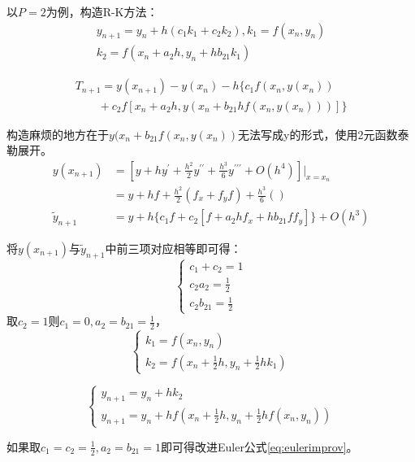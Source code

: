 \documentclass{article}
\begin{document}
以$P=2$为例，构造R-K方法：
$$
\begin{array}{lr}
    y_{n+1} = y_n + h(c_1k_1+c_2k_2), k_1=f(x_n, y_n)\\
    k_2 = f(x_n+a_2h, y_n+hb_{21}k_1)
\end{array}
$$

\begin{equation*}
    \begin{array}{lr}
        T_{n+1}=y(x_{n+1})-y(x_n)-h\{c_1f(x_n, y(x_n)) \\
        \quad \quad +c_2f[x_n+a_2h, y(x_n+b_{21}hf(x_n, y(x_n)))]\}
    \end{array}
\end{equation*}

构造麻烦的地方在于$y(x_n+b_{21}f(x_n, y(x_n))$无法写成y的形式，使用2元函数泰勒展开。
\begin{equation*}
    \begin{split}
        y(x_{n+1})&=[y+hy^{'}+\frac{h^2}{2}y^{{'}{'}}+\frac{h^3}{6}y^{{'}{'}{'}}+O(h^4)]|_{x=x_n}\\
        &=y+hf+\frac{h^2}{2}(f_x+f_yf)+\frac{h^3}{6}() \\
        \widetilde{y}_{n+1} &= y + h\{c_1f + c_2[f+a_2hf_x+hb_{21}ff_y]\} + O(h^3)
    \end{split}
\end{equation*}

将$y(x_{n+1})$与$\widetilde{y}_{n+1}$中前三项对应相等即可得：
$$
\left\{
\begin{array}{lr}
    c_1+c_2 = 1 \\
    c_2a_2 = \frac{1}{2} \\
    c_2b_{21} = \frac{1}{2}
\end{array}\right.
$$
取$c_2=1$则$c_1=0,a_2=b_{21}=\frac{1}{2}$，
$$
\left\{
\begin{array}{lr}
    k_1 = f(x_n, y_n) \\
    k_2 = f(x_n+\frac{1}{2}h, y_n+\frac{1}{2}hk_1)
\end{array}\right.
$$

\begin{equation}
    \left\{
        \begin{array}{lr}
            y_{n+1} = y_n+hk_2 \\
            y_{n+1} = y_n+hf(x_n+\frac{1}{2}h, y_n+\frac{1}{2}hf(x_n, y_n))
        \end{array}
        \right.
\end{equation}

如果取$c_1=c_2=\frac{1}{2}, a_2=b_{21}=1$即可得改进Euler公式\ref{eq:eulerimprov}。
\end{document}
